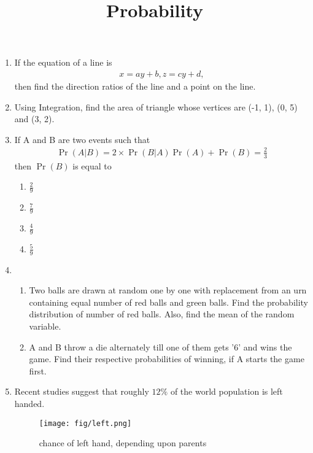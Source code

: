 \documentclass{article}
\providecommand{\pr}[1]{\ensuremath{\Pr\left(#1\right)}}
\begin{document}
\begin{enumerate}
\item If the equation of a line is
       \begin{align}
	x = ay + b, z = cy +d,
       \end{align}  then find the direction ratios of the line and a point on the line.

\item Using Integration, find the area of triangle whose vertices are (-1, 1), (0, 5) and (3, 2).

	\newpage

\title{\textbf{Probability}}
\date{}		
\maketitle
	
	\item If A and B are two events such that 
		\begin{align}
			\pr{A|B} = 2 \times  \pr{B|A}\pr{A} + \pr{B}  = \frac{2}{3}
		\end{align}then \pr{B}  is equal to
\begin{enumerate}
\item $\frac{2}{9}$
\item $\frac{7}{9}$
\item $\frac{4}{9}$
\item $\frac{5}{9}$
\end{enumerate}

\item
\begin{enumerate}
\item Two balls are drawn at random one by one with replacement from an urn containing equal number of red balls and green balls. Find the probability distribution of number of red balls. Also, find the mean of the random variable.
\item A and B throw a die alternately till one of them gets '6' and wins the game. Find their respective probabilities of winning, if A starts the game first.
\end{enumerate}

\item Recent studies suggest that roughly $12\%$ of the world population is left handed.
	
\begin{figure}[h!]
\centering
\texttt{[image: fig/left.png]}
\caption{chance of left hand, depending upon parents}
\label{fig:left.png}
\end{figure}


\end{enumerate}
\end{document}
